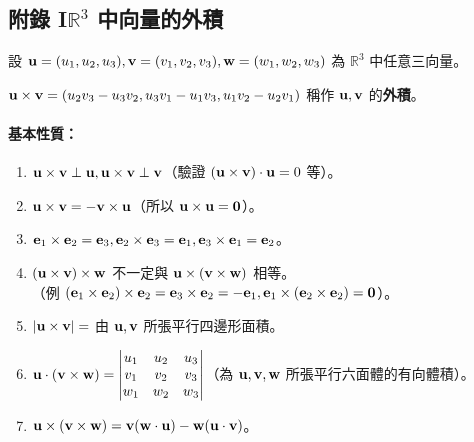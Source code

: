 \subsection*{附錄 I\quad \texorpdfstring{$\mathbb{R}^3$}{R3} 中向量的外積}\label{sec:b6-ch1-app-crossproduct}
\resetsectcounters

設 $\vect{u}=(u_1, u_2, u_3), \vect{v}=(v_1, v_2, v_3), \vect{w}=(w_1, w_2, w_3)$ 為 $\mathbb{R}^3$ 中任意三向量。

\begin{definition}\label{def:b6-1-cross}
$\vect{u} \times \vect{v} = (u_2v_3 - u_3v_2, u_3v_1 - u_1v_3, u_1v_2 - u_2v_1)$ 稱作 $\vect{u}, \vect{v}$ 的\textbf{外積}。
\end{definition}

\paragraph{基本性質：}
\begin{enumerate}[label=\Roman*., leftmargin=2.5em]
  \item $\vect{u} \times \vect{v} \perp \vect{u}, \vect{u} \times \vect{v} \perp \vect{v}$（驗證 $(\vect{u} \times \vect{v}) \cdot \vect{u} = 0$ 等）。
  \item $\vect{u} \times \vect{v} = - \vect{v} \times \vect{u}$（所以 $\vect{u} \times \vect{u} = \vect{0}$）。
  \item $\vect{e}_1 \times \vect{e}_2 = \vect{e}_3, \vect{e}_2 \times \vect{e}_3 = \vect{e}_1, \vect{e}_3 \times \vect{e}_1 = \vect{e}_2$。
  \item $(\vect{u} \times \vect{v}) \times \vect{w}$ 不一定與 $\vect{u} \times (\vect{v} \times \vect{w})$ 相等。\\
  （例 $(\vect{e}_1 \times \vect{e}_2) \times \vect{e}_2 = \vect{e}_3 \times \vect{e}_2 = -\vect{e}_1, \vect{e}_1 \times (\vect{e}_2 \times \vect{e}_2) = \vect{0}$）。
  \item $|\vect{u} \times \vect{v}| = $ 由 $\vect{u}, \vect{v}$ 所張平行四邊形面積。
  \item $\vect{u} \cdot (\vect{v} \times \vect{w}) = \begin{vmatrix}
  u_1 & u_2 & u_3 \\
  v_1 & v_2 & v_3 \\
  w_1 & w_2 & w_3
  \end{vmatrix}$（為 $\vect{u}, \vect{v}, \vect{w}$ 所張平行六面體的有向體積）。
  \item $\vect{u} \times (\vect{v} \times \vect{w}) = \vect{v}(\vect{w} \cdot \vect{u}) - \vect{w}(\vect{u} \cdot \vect{v})$。
\end{enumerate}

